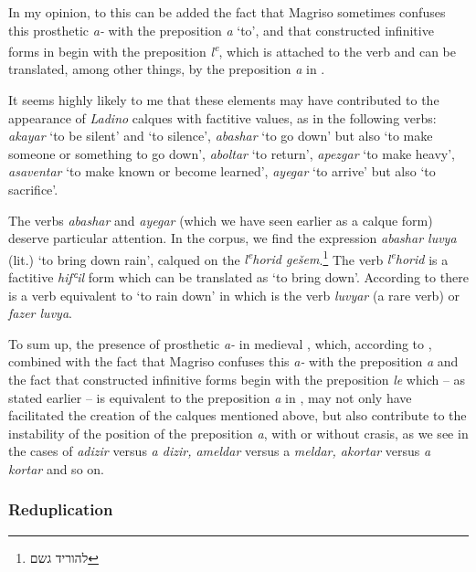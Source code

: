 \documentclass[output=paper,colorlinks,citecolor=brown,babel,arabicfont]{langscibook}
\begin{document}
In my opinion, to this can be added the fact that Magriso sometimes confuses this prosthetic \textit{a-} with the  preposition \textit{a} `to', and that constructed infinitive forms in  begin with the preposition \textit{l\textsuperscript{e}}, which is attached to the verb and can be translated, among other things, by the preposition \textit{a} in . 

It seems highly likely to me that these elements may have contributed to the appearance of \textit{Ladino} calques with factitive values, as in the following verbs: \textit{akayar} `to be silent' and `to silence', \textit{abashar} `to go down' but also `to make someone or something to go down', \textit{aboltar} `to return', \textit{apezgar} `to make heavy', \textit{asaventar} `to make known or become learned', \textit{ayegar} `to arrive' but also `to sacrifice'.

The verbs \textit{abashar} and \textit{ayegar} (which we have seen earlier as a calque form) deserve particular attention. In the corpus, we find the expression \textit{abashar luvya} (lit.) `to bring down rain', calqued on the  \textit{l\textsuperscript{e}horid gešem}.\footnote{\texthebrew{להוריד גשם}} The  verb \textit{l\textsuperscript{e}horid} is a factitive \textit{hifʿil} form which can be translated as `to bring down'. According to \citet[333]{nehama1997} there is a verb equivalent to `to rain down' in  which is the verb \textit{luvyar} (a rare verb) or \textit{fazer luvya}.  

To sum up, the presence of prosthetic \textit{a-} in medieval , which, according to \citet[27]{hanssen1966}, combined with the fact that Magriso confuses this \textit{a-} with the  preposition \textit{a} and the fact that  constructed infinitive forms begin with the preposition \textit{le} which -- as stated earlier -- is equivalent to the preposition \textit{a} in , may not only have facilitated the creation of the calques mentioned above, but also contribute to the instability of the position of the preposition \textit{a}, with or without crasis, as we see in the cases of \textit{adizir} versus \textit{a dizir, ameldar} versus a \textit{meldar, akortar} versus \textit{a kortar} and so on. 

\subsubsection{Reduplication}\label{ch3.7.ss.3.3.6}
\end{document}
